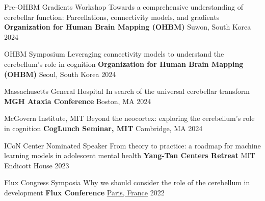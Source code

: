

\begin{cventries}

	\cventry
	{Pre-OHBM Gradients Workshop} %
	{Towards a comprehensive understanding of cerebellar function:
Parcellations, connectivity models, and gradients
} %
	{\textbf{Organization for Human Brain Mapping (OHBM)}} %
	{Suwon, South Korea} %
	{2024} %

	\cventry
	{OHBM Symposium} %
	{Leveraging  connectivity models to understand the cerebellum’s role in cognition} %
	{\textbf{Organization for Human Brain Mapping (OHBM)}} %
	{Seoul, South Korea} %
	{2024} %
	
	
	\cventry
	{Massachusetts General Hospital} %
	{In search of the universal cerebellar transform} %
	{\textbf{MGH Ataxia Conference}} %
	{Boston, MA} %
	{2024} %
	
 \cventry
	{McGovern Institute, MIT} %
	{Beyond the neocortex: exploring the cerebellum's role in cognition} %
	{\textbf{CogLunch Seminar, MIT}} %
	{Cambridge, MA} %
	{2024} %


  \cventry
    {ICoN Center Nominated Speaker} %
    {From theory to practice: a roadmap for machine learning models in adolescent mental health} %
    {\textbf{Yang-Tan Centers Retreat}} %
    {MIT Endicott House} %
    {2023} %

  \cventry
    {Flux Congress Symposia} %
    {Why we should consider the role of the cerebellum in development} %
    {\textbf{Flux Conference}} %
    {\href{https://youtu.be/u0O88zD28f4?si=uFwx1z4Sw68Qlg5d}{Paris, France}} %
    {2022} %


\end{cventries}
